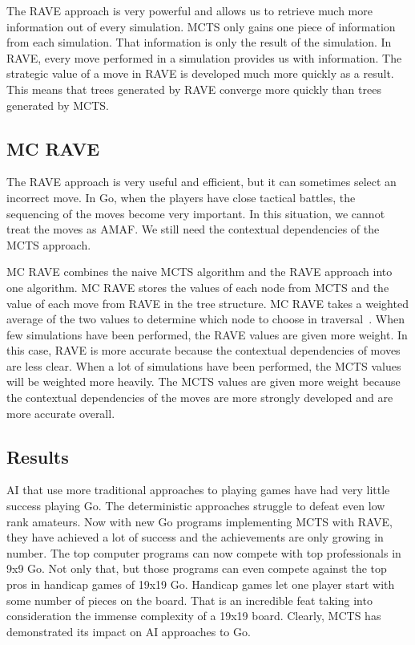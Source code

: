 \documentclass{sig-alternate}
\begin{document}
The RAVE approach is very powerful and allows us to retrieve much more information out of every simulation. MCTS only gains one piece of information from each simulation. That information is only the result of the simulation. In RAVE, every move performed in a simulation provides us with information. The strategic value of a move in RAVE is developed much more quickly as a result. This means that trees generated by RAVE converge more quickly than trees generated by MCTS.

\subsection{MC RAVE}
The RAVE approach is very useful and efficient, but it can sometimes select an incorrect move\cite{RAVEinGo}. In Go, when the players have close tactical battles, the sequencing of the moves become very important. In this situation, we cannot treat the moves as AMAF. We still need the contextual dependencies of the MCTS approach.

MC RAVE combines the naive MCTS algorithm and the RAVE approach into one algorithm. MC RAVE stores the values of each node from MCTS and the value of each move from RAVE in the tree structure. MC RAVE takes a weighted average of the two values to determine which node to choose in traversal~\cite{RAVEinGo}. When few simulations have been performed, the RAVE values are given more weight. In this case, RAVE is more accurate because the contextual dependencies of moves are less clear. When a lot of simulations have been performed, the MCTS values will be weighted more heavily. The MCTS values are given more weight because the contextual dependencies of the moves are more strongly developed and are more accurate overall.
\subsection{Results}
AI that use more traditional approaches to playing games have had very little success playing Go. The deterministic approaches struggle to defeat even low rank amateurs. Now with new Go programs implementing MCTS with RAVE, they have achieved a lot of success and the achievements are only growing in number. The top computer programs can now compete with top professionals in 9x9 Go\cite{RAVEinGo}. Not only that, but those programs can even compete against the top pros in handicap games of 19x19 Go. Handicap games let one player start with some number of pieces on the board. That is an incredible feat taking into consideration the immense complexity of a 19x19 board. Clearly, MCTS has demonstrated its impact on AI approaches to Go.
\end{document}
